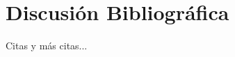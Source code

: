 \chapter{Discusión Bibliográfica}

Citas y más citas...

\lipsum[1]

\lipsum[2]

\lipsum[3]

\lipsum[4]

\lipsum[5]
